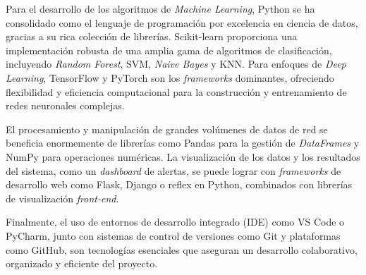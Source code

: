 Para el desarrollo de los algoritmos de \textit{Machine Learning}, Python se ha consolidado como el lenguaje de programación por excelencia en ciencia de datos, gracias a su rica colección de librerías. Scikit-learn proporciona una implementación robusta de una amplia gama de algoritmos de clasificación, incluyendo \textit{Random Forest}, SVM, \textit{Naive Bayes} y KNN. Para enfoques de \textit{Deep Learning}, TensorFlow y PyTorch son los \textit{frameworks} dominantes, ofreciendo flexibilidad y eficiencia computacional para la construcción y entrenamiento de redes neuronales complejas.

El procesamiento y manipulación de grandes volúmenes de datos de red se beneficia enormemente de librerías como Pandas para la gestión de \textit{DataFrames} y NumPy para operaciones numéricas. La visualización de los datos y los resultados del sistema, como un \textit{dashboard} de alertas, se puede lograr con \textit{frameworks} de desarrollo web como Flask, Django o reflex en Python, combinados con librerías de visualización \textit{front-end}.

Finalmente, el uso de entornos de desarrollo integrado (IDE) como VS Code o PyCharm, junto con sistemas de control de versiones como Git y plataformas como GitHub, son tecnologías esenciales que aseguran un desarrollo colaborativo, organizado y eficiente del proyecto.